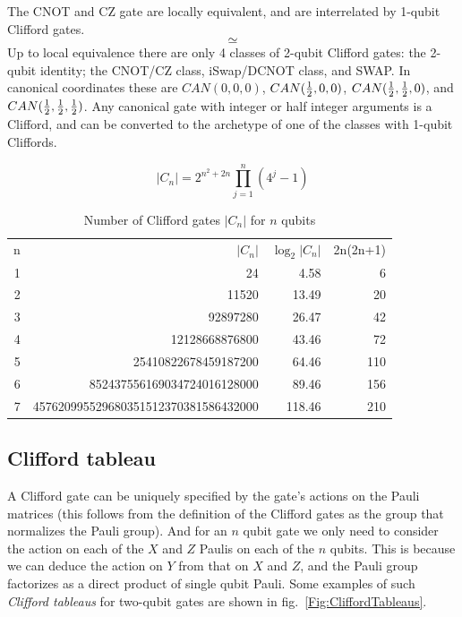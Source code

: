 The CNOT and CZ gate are locally equivalent, and are interrelated by 1-qubit Clifford gates. 
$$

\simeq

$$
Up to local equivalence there are only 4 classes of 2-qubit Clifford gates: the 2-qubit identity; the CNOT/CZ class, iSwap/DCNOT class, and SWAP. In canonical coordinates these are $CAN(0,0,0)$, $CAN(\half,0,0)$, $CAN(\half,\half,0)$, and $CAN(\half,\half,\half)$.  Any canonical gate with integer or half integer arguments is a Clifford, and can be converted to the archetype of one of the classes with 1-qubit Cliffords.  




\begin{table}[tp]
\caption{Number of Clifford gates $|C_n|$ for $n$ qubits \cite{???}}
\label{Fig:CliffordNumbers}
$$|C_n| = 2^{n^2+2n} \prod_{j=1}^{n} (4^j-1)$$
\begin{center}
\begin{tabular}{rrrr}
n &  $|C_n|$ & $\log_2 |C_n|$ & 2n(2n+1) \\
1 & 24 & 4.58 & 6 \\
2 & 11520 & 13.49 & 20 \\
3 & 92897280 & 26.47 & 42 \\
4 & 12128668876800 & 43.46 & 72 \\
5 & 25410822678459187200 & 64.46 & 110 \\
6 & 852437556169034724016128000 & 89.46 & 156 \\
7 & 457620995529680351512370381586432000 & 118.46 & 210 \\
\end{tabular}
\end{center}
\end{table}



\subsection{Clifford tableau}

A Clifford gate can be uniquely specified by the gate's actions on the Pauli matrices (this follows from the definition of the Clifford gates as the group that normalizes the Pauli group). And for an $n$ qubit gate we only need to consider the action on each of the $X$ and $Z$ Paulis on each of the $n$ qubits. This is because we can deduce the action on $Y$ from that on $X$ and $Z$, and the Pauli group factorizes as a direct product of single qubit Pauli. Some examples of such {\sl Clifford tableaus} for two-qubit gates are shown in fig.~\ref{Fig:CliffordTableaus}. 

